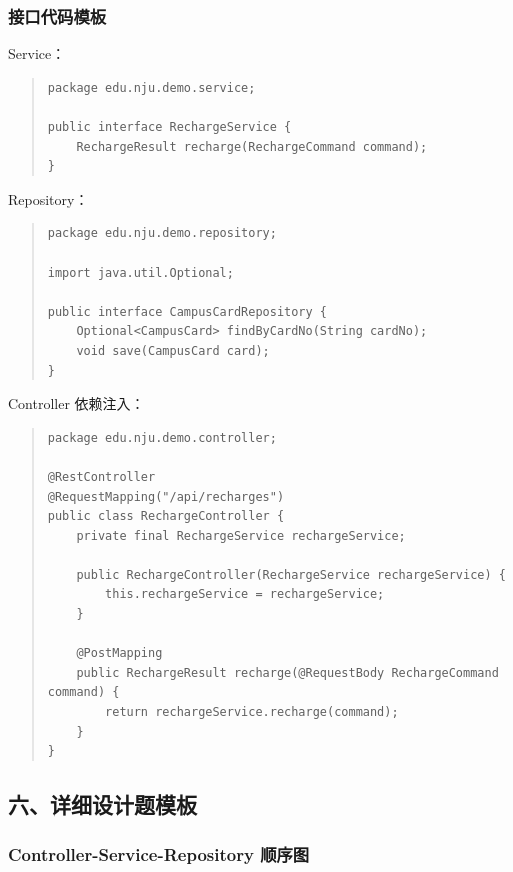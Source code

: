 \documentclass[UTF8,zihao=-4]{ctexart}
\begin{document}
\subsubsection{接口代码模板}


Service：


\begin{quote}
\footnotesize
\begin{verbatim}
package edu.nju.demo.service;

public interface RechargeService {
    RechargeResult recharge(RechargeCommand command);
}
\end{verbatim}
\end{quote}


Repository：


\begin{quote}
\footnotesize
\begin{verbatim}
package edu.nju.demo.repository;

import java.util.Optional;

public interface CampusCardRepository {
    Optional<CampusCard> findByCardNo(String cardNo);
    void save(CampusCard card);
}
\end{verbatim}
\end{quote}


Controller 依赖注入：


\begin{quote}
\footnotesize
\begin{verbatim}
package edu.nju.demo.controller;

@RestController
@RequestMapping("/api/recharges")
public class RechargeController {
    private final RechargeService rechargeService;

    public RechargeController(RechargeService rechargeService) {
        this.rechargeService = rechargeService;
    }

    @PostMapping
    public RechargeResult recharge(@RequestBody RechargeCommand command) {
        return rechargeService.recharge(command);
    }
}
\end{verbatim}
\end{quote}


\subsection{六、详细设计题模板}


\subsubsection{Controller-Service-Repository 顺序图}
\end{document}
